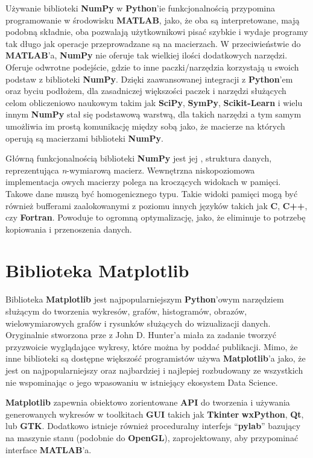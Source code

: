 Używanie biblioteki \textbf{NumPy} w \textbf{Python}'ie funkcjonalnością przypomina programowanie w środowisku \textbf{MATLAB}, jako, że oba są interpretowane, mają podobną składnie, oba pozwalają użytkownikowi pisać szybkie i wydaje programy tak długo jak operacje przeprowadzane są na macierzach. W przeciwieństwie do \textbf{MATLAB}'a, \textbf{NumPy} nie oferuje tak wielkiej ilości dodatkowych narzędzi. Oferuje odwrotne podejście, gdzie to inne paczki/narzędzia korzystają u swoich podstaw z biblioteki \textbf{NumPy}. Dzięki zaawansowanej integracji z \textbf{Python}'em oraz byciu podłożem, dla zasadniczej większości paczek i narzędzi służących celom obliczeniowo naukowym takim jak \textbf{SciPy}, \textbf{SymPy}, \textbf{Scikit-Learn} i wielu innym \textbf{NumPy} stał się podstawową warstwą, dla takich narzędzi a tym samym umożliwia im prostą komunikację między sobą jako, że macierze na których operują są macierzami biblioteki \textbf{NumPy}.

Główną funkcjonalnością biblioteki \textbf{NumPy} jest jej , struktura danych, reprezentująca \textit{n}-wymiarową macierz. Wewnętrzna niskopoziomowa implementacja owych macierzy polega na kroczących widokach w pamięci. Takowe dane muszą być homogenicznego typu. Takie widoki pamięci mogą być również bufferami zaalokowanymi z poziomu innych języków takich jak \textbf{C}, \textbf{C++}, czy \textbf{Fortran}. Powoduje to ogromną optymalizację, jako, że eliminuje to potrzebę kopiowania i przenoszenia danych.



\section{Biblioteka Matplotlib}

Biblioteka \textbf{Matplotlib} \cite{MatplotlibDocumentation} \cite{Matplotlib30Cookbook} \cite{PythonForDataAnalysis} \cite{WikipediaMatplotlib} jest najpopularniejszym \textbf{Python}'owym narzędziem służącym do tworzenia wykresów, grafów, histogramów, obrazów, wielowymiarowych grafów i rysunków służących do wizualizacji danych. Oryginalnie stworzona prze z John D. Hunter'a miała za zadanie tworzyć przyzwoicie wyglądające wykresy, które można by poddać publikacji. Mimo, że inne biblioteki są dostępne większość programistów używa \textbf{Matplotlib}'a jako, że jest on najpopularniejszy oraz najbardziej i najlepiej rozbudowany ze wszystkich nie wspominając o jego wpasowaniu w istniejący ekosystem Data Science.

\textbf{Matplotlib} zapewnia obiektowo zorientowane \textbf{API} do tworzenia i używania generowanych wykresów w toolkitach \textbf{GUI} takich jak \textbf{Tkinter} \textbf{wxPython}, \textbf{Qt}, lub \textbf{GTK}. Dodatkowo istnieje również proceduralny interfejs ``\textbf{pylab}'' bazujący na maszynie stanu (podobnie do \textbf{OpenGL}), zaprojektowany, aby przypominać interface \textbf{MATLAB}'a.

